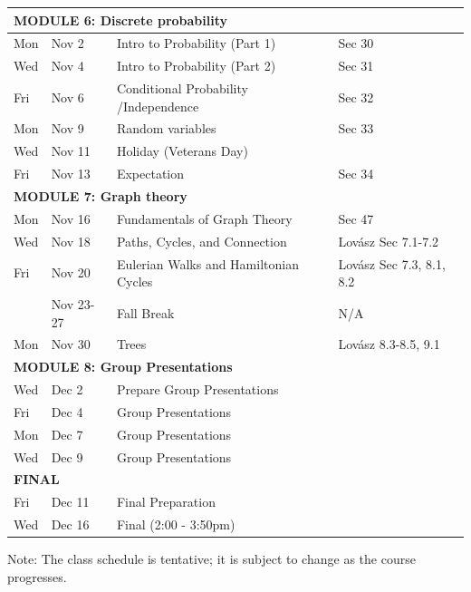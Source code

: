 \documentclass[letterpaper]{inzane_syllabus} %
\begin{document}
\begin{center}
\begin{tabularx}{\textwidth}{p{2cm}p{2cm}p{8cm}p{9.5cm}}
\hline
\multicolumn{4}{l}{\textbf{\textcolor{myCOLOR}{\large MODULE 6: Discrete probability}}} \\
\hline
 Mon & Nov 2  & Intro to Probability (Part 1) & Sec 30 \\ 
Wed & Nov 4   &  Intro to Probability  (Part 2) & Sec 31 \\
Fri &  Nov 6  & Conditional Probability /Independence &  Sec 32\\
 Mon &  Nov 9 &  Random variables & Sec 33 \\
Wed  &  Nov 11 & Holiday (Veterans Day) &  \\
Fri  &  Nov 13   & Expectation & Sec 34 \\
\hline
\multicolumn{4}{l}{\textbf{\textcolor{myCOLOR}{\large MODULE 7: Graph theory}}} \\
\hline
Mon &  Nov 16 & Fundamentals of Graph Theory & Sec 47 \\
Wed &  Nov 18 & Paths, Cycles, and Connection & Lov\'asz Sec 7.1-7.2 \\
Fri &  Nov 20  & Eulerian Walks and Hamiltonian Cycles & Lov\'asz Sec 7.3, 8.1, 8.2 \\
 &  Nov 23-27 & Fall Break & N/A  \\
Mon &  Nov 30 & Trees & Lov\'asz  8.3-8.5, 9.1 \\
\hline
\multicolumn{4}{l}{\textbf{\textcolor{myCOLOR}{\large MODULE 8: Group Presentations}}} \\
\hline
Wed &  Dec 2 & Prepare Group Presentations & \\
Fri &  Dec 4 & Group Presentations & \\
Mon &  Dec 7 & Group Presentations & \\
Wed &  Dec 9 & Group Presentations & \\
\hline
\multicolumn{4}{l}{\textbf{\textcolor{myCOLOR}{\large FINAL}}} \\
\hline
Fri & Dec 11 &  Final Preparation  &\\
Wed & Dec 16 & Final (2:00 - 3:50pm) & \\
\hline
\hline 
\end{tabularx}
Note: The class schedule is tentative; it is subject to change as the course progresses.
\end{center}
\end{document}

